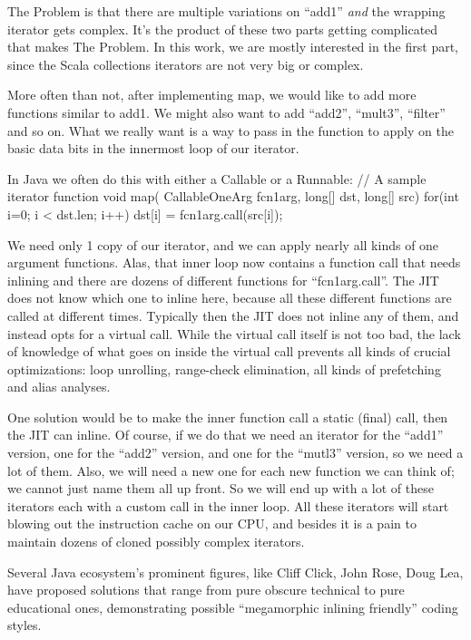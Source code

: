The Problem is that there are multiple variations on ``add1'' \emph{and}
the wrapping iterator gets complex.  It’s the product of these two parts getting
complicated that makes The Problem. In this work, we are mostly interested in
the first part, since the Scala collections iterators are not very big or
complex.

More often than not, after implementing map, we would like to add more
functions similar to add1. We might also want to add ``add2'', ``mult3'',
``filter'' and so on. What we really want is a way to pass in the function to
apply on the basic data bits in the innermost loop of our iterator.

In Java we often do this with either a Callable or a Runnable:
// A sample iterator function
void map( CallableOneArg fcn1arg, long[] dst, long[] src) {
  for(int i=0; i < dst.len; i++)
    dst[i] = fcn1arg.call(src[i]);
}
  
We need only 1 copy of our iterator, and we can apply nearly all kinds of one
argument functions. Alas, that inner loop now contains a function call that
needs inlining and there are dozens of different functions for ``fcn1arg.call''.
The JIT does not know which one to inline here, because all these different
functions are called at different times.  Typically then the JIT does not inline
any of them, and instead opts for a virtual call.  While the virtual call
itself is not too bad, the lack of knowledge of what goes on inside the virtual
call prevents all kinds of crucial optimizations: loop unrolling, range-check
elimination, all kinds of prefetching and alias analyses.

One solution  would be to make the inner function call a static (final)
call, then the JIT can inline. Of course, if we do that we need an iterator for
the ``add1'' version, one for the ``add2'' version, and one for the
``mutl3'' version, so we need a lot of them. Also, we will need a new one for
each new function we can think of; we cannot just name them all up front.  So we
will end up with a lot of these iterators each with a custom call in the inner
loop. All these iterators will start blowing out the instruction cache on our
CPU, and besides it is a pain to maintain dozens of cloned possibly complex
iterators.

Several Java ecosystem's prominent figures, like Cliff Click, John Rose, Doug
Lea, have proposed solutions that range from pure obscure technical to pure
educational ones, demonstrating possible ``megamorphic inlining friendly''
coding styles.

